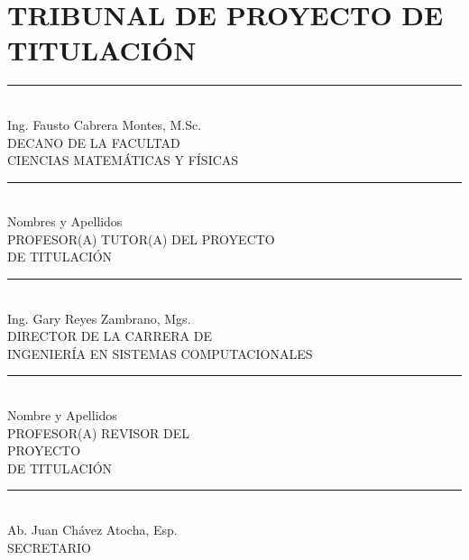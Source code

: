 \documentclass[12pt, a4paper, nofontenc, numbers=endperiod]{apa7}
\begin{document}
	{ %
		\section*{\large \centering TRIBUNAL DE PROYECTO DE TITULACIÓN}
		
		\vspace*{5cm}	
		\begin{multicols}{2}
			\singlespacing
			\begin{center}
				\rule[1mm]{60mm}{0.1mm} \\
				Ing. Fausto Cabrera Montes, M.Sc.\\
				DECANO DE LA  FACULTAD\\
				CIENCIAS MATEMÁTICAS Y FÍSICAS 
			\end{center}
			\vspace*{2.5cm}
			\begin{center}
				\rule[1mm]{60mm}{0.1mm} \\
				Nombres y Apellidos\\
				PROFESOR(A) TUTOR(A) DEL PROYECTO\\
				DE TITULACIÓN	
			\end{center}
			\vspace*{-0.6cm}
			\begin{center}
				\rule[1mm]{60mm}{0.1mm} \\
				Ing. Gary Reyes Zambrano, Mgs. \\
				DIRECTOR DE LA CARRERA DE \\
				INGENIERÍA EN SISTEMAS COMPUTACIONALES
			\end{center}
			\vspace*{2cm}
			\begin{center}
				\rule[1mm]{60mm}{0.1mm} \\
				Nombre y Apellidos\\ PROFESOR(A) REVISOR DEL\\
				PROYECTO\\
				DE TITULACIÓN		
			\end{center}	
		\end{multicols}
		\vspace*{2cm}
		\begin{center}
			\singlespacing	
			\rule[1mm]{70mm}{0.1mm} \\ Ab. Juan Chávez Atocha, Esp.\\
			SECRETARIO 
		\end{center}
	}
	\newpage
\end{document}
